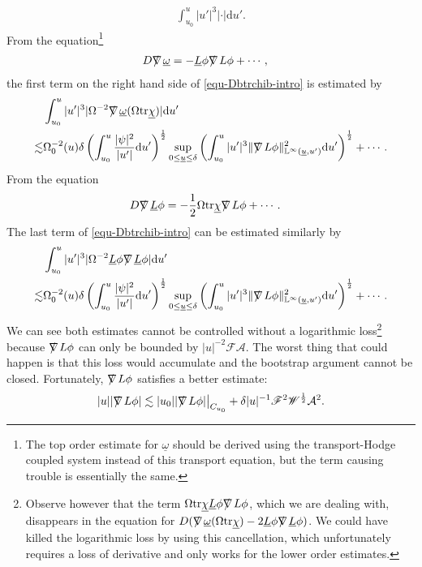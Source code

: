 \documentclass[11pt,reqno]{amsart}
\theoremstyle{definition}
\numberwithin{equation}{section}
\newcommand{\D}{\mathrm{d}}
\newcommand{\tr}{\mathrm{tr}}
\renewcommand{\L}{\mathbb{L}}
\def\chib{\underline{\chi}}
\def\Lb{\underline{L}}
\def\tr{\mathrm{tr}}
\def\omegab{\underline{\omega}}
\def\ub{\underline{u}}
\def\nablas{\mbox{$\nabla \mkern -13mu /$ }}
\begin{document}
\begin{align*}
\int_{u_0}^u|u'|^{3}|\cdot|\D u'.
\end{align*}
From the equation\footnote{The top order estimate for $\omegab$ should be derived using the transport-Hodge coupled system instead of this transport equation, but the term causing trouble is essentially the same.}
\begin{align*}
D\nablas\omegab&=-\Lb\phi\nablas L\phi+\cdots,
\end{align*}
the first term on the right hand side of \eqref{equ-Dbtrchib-intro} is estimated by
\begin{align*}
&\int_{u_0}^u|u'|^{3}|\Omega^{-2}\nablas\omegab(\Omega\tr\chib)|\D u'\\\lesssim&\Omega_0^{-2}(u)\delta\left(\int_{u_0}^u\frac{|\psi|^2}{|u'|}\D u'\right)^{\frac{1}{2}}\sup_{0\le\ub\le\delta}\left(\int_{u_0}^u|u'|^3\|\nablas L\phi\|_{\L^\infty(\ub,u')}^2\D u'\right)^{\frac{1}{2}}+\cdots.
\end{align*}
From the equation
\begin{align*}
D\nablas\Lb\phi&=-\frac{1}{2}\Omega\tr\chib\nablas L\phi+\cdots.
\end{align*}
The last term of \eqref{equ-Dbtrchib-intro} can be estimated similarly by
\begin{align*}
&\int_{u_0}^u|u'|^{3}|\Omega^{-2}\Lb\phi\nablas\Lb\phi|\D u'\\
\lesssim&\Omega_0^{-2}(u)\delta\left(\int_{u_0}^u\frac{|\psi|^2}{|u'|}\D u'\right)^{\frac{1}{2}}\sup_{0\le\ub\le\delta}\left(\int_{u_0}^u|u'|^3\|\nablas L\phi\|_{\L^\infty(\ub,u')}^2\D u'\right)^{\frac{1}{2}}+\cdots.
\end{align*}
We can see both estimates cannot be controlled without a logarithmic loss\footnote{Observe however that the term $\Omega\tr\chib \Lb\phi\nablas L\phi$, which we are dealing with, disappears in the equation for  $D(\nablas\omegab(\Omega\tr\chib)-2\Lb\phi\nablas\Lb\phi)$. We could have killed the logarithmic loss by using this cancellation, which unfortunately requires a loss of derivative and only works for the lower order estimates.} because $\nablas L\phi$ can only be bounded by $|u|^{-2}\mathscr{F}\mathcal{A}$. The worst thing that could happen is that this loss would accumulate and the bootstrap argument cannot be closed. Fortunately, $\nablas L\phi$ satisfies a better estimate:
\begin{align*}
|u||\nablas L\phi|\lesssim|u_0||\nablas L\phi|\big|_{C_{u_0}}+\delta|u|^{-1}\mathscr{F}^2\mathscr{W}^{\frac{1}{2}}\mathcal{A}^2.
\end{align*}
\end{document}
